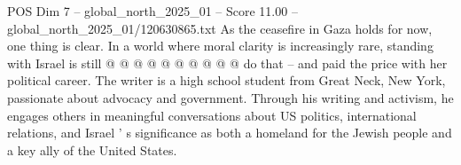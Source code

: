 \begin{textsample}{POS Dim 7 – global\_north\_2025\_01 – Score 11.00 – global\_north\_2025\_01/120630865.txt}
As the ceasefire in Gaza holds for now, one thing is clear.
In a world where moral clarity is increasingly rare, standing with Israel is still @ @ @ @ @ @ @ @ @ @ do that -- and paid the price with her political career.
The writer is a high school student from Great Neck, New York, passionate about advocacy and government.
Through his writing and activism, he engages others in meaningful conversations about US politics, international relations, and Israel ' s significance as both a homeland for the Jewish people and a key ally of the United States.

\end{textsample}
